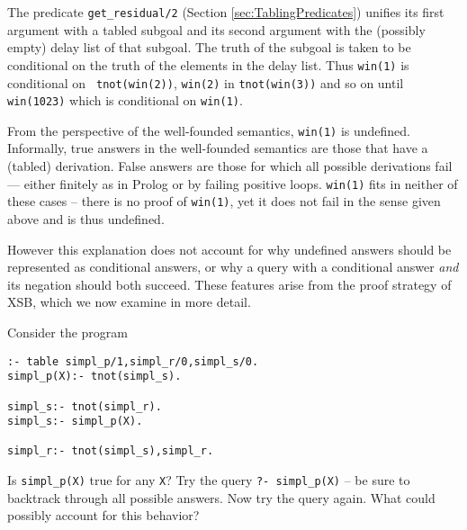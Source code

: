 The predicate {\tt get\_residual/2} (Section \ref{sec:TablingPredicates})
unifies its first argument with a tabled subgoal and its second
argument with the (possibly empty) delay list of that subgoal.  The
truth of the subgoal is taken to be conditional on the truth of the
elements in the delay list.  Thus {\tt win(1)} is conditional on {\tt
tnot(win(2))}, {\tt win(2)} in {\tt tnot(win(3))} and so on until {\tt
win(1023)} which is conditional on {\tt win(1)}.

From the perspective of the well-founded semantics, {\tt win(1)} is
undefined.  Informally, true answers in the well-founded semantics are
those that have a (tabled) derivation.  False answers are those for
which all possible derivations fail --- either finitely as in Prolog
or by failing positive loops.  {\tt win(1)} fits in neither of these
cases -- there is no proof of {\tt win(1)}, yet it does not fail in
the sense given above and is thus undefined.

However this explanation does not account for why undefined answers
should be represented as conditional answers, or why a query with a
conditional answer {\em and} its negation should both succeed.  These
features arise from the proof strategy of XSB, which we now examine in
more detail.

\begin{exercise} \label{ex:simpl}
Consider the program
\begin{verbatim}
:- table simpl_p/1,simpl_r/0,simpl_s/0.
simpl_p(X):- tnot(simpl_s).

simpl_s:- tnot(simpl_r).
simpl_s:- simpl_p(X).

simpl_r:- tnot(simpl_s),simpl_r.
\end{verbatim}
Is {\tt simpl\_p(X)} true for any {\tt X}?  Try the query {\tt ?-
simpl\_p(X)} -- be sure to backtrack through all possible answers.
Now try the query again.  What could possibly account for this
behavior?
\end{exercise}

